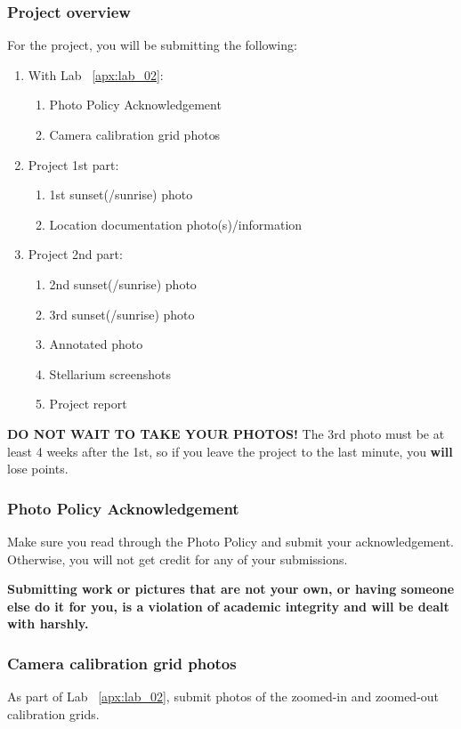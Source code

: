 \documentclass[main.tex]{subfiles}
\begin{document}
\subsubsection{Project overview}
For the project, you will be submitting the following:
\begin{enumerate}
\item With Lab ~\ref{apx:lab_02}:
	\begin{enumerate}
	\item Photo Policy Acknowledgement
	\item Camera calibration grid photos
	\end{enumerate}
\item Project 1st part:
	\begin{enumerate}
	\item 1st sunset(/sunrise) photo
	\item Location documentation photo(s)/information
	\end{enumerate}
\item Project 2nd part:
	\begin{enumerate}
	\item 2nd sunset(/sunrise) photo
	\item 3rd sunset(/sunrise) photo
	\item Annotated photo
	\item Stellarium screenshots
	\item Project report
	\end{enumerate}
\end{enumerate}
\textbf{DO NOT WAIT TO TAKE YOUR PHOTOS!} The 3rd photo must be at least 4 weeks after the 1st, so if you leave the project to the last minute, you \textbf{will} lose points.

\subsubsection{Photo Policy Acknowledgement}
Make sure you read through the Photo Policy and submit your acknowledgement. Otherwise, you will not get credit for any of your submissions.

\textbf{Submitting work or pictures that are not your own, or having someone else do it for you, is a violation of academic integrity and will be dealt with harshly.}

\subsubsection{Camera calibration grid photos}
As part of Lab ~\ref{apx:lab_02}, submit photos of the zoomed-in and zoomed-out calibration grids.
\end{document}
